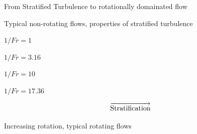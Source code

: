 \documentclass{beamer}
\begin{document}
\begin{frame}{From Stratified Turbulence to rotationally domainated flow}
    \centering

    Typical non-rotating flows, properties of stratified turbulence


        \centering
        $1/Fr = 1$
        \vspace{2pt}
        
    \emp
    \hspace{1pt}
        \centering
        $1/Fr = 3.16$
        \vspace{2pt}
        
    \emp
    \hspace{1pt}
        \centering
        $1/Fr = 10$
        \vspace{2pt}
        
    \emp
    \hspace{1pt}
        \centering
        $1/Fr = 17.36$
        \vspace{2pt}
        
    \emp
    \[\overrightarrow{\rm Stratification}\]
\end{frame}

\begin{frame}
    Increasing rotation, typical rotating flows
\end{frame}
\end{document}
